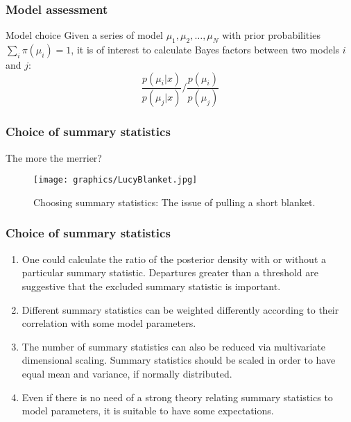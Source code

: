 \documentclass{beamer}
\newcommand{\1}{\ensuremath{\mathbf{1}}}
\begin{document}
%
%
%
\begin{frame}\frametitle{Model assessment}
	\begin{block}{Model choice}
		Given a series of model $\mu_1, \mu_2, \ldots, \mu_N$ with prior probabilities $\sum_i \pi(\mu_i) = 1$, it is of interest to calculate Bayes factors between two models $i$ and $j$:
		\begin{equation}
			\frac{p(\mu_i|x)}{p(\mu_j|x)} / \frac{p(\mu_i)}{p(\mu_j)} 
		\end{equation}
	\end{block}
\end{frame}
%
%
%
\begin{frame}\frametitle{Choice of summary statistics}
	The more the merrier?
	\begin{figure}
	\begin{center}
		\texttt{[image: graphics/LucyBlanket.jpg]}
	\end{center}
	\caption{Choosing summary statistics: The issue of pulling a short blanket.}
	\end{figure}
\end{frame}
%
%
%
\begin{frame}\frametitle{Choice of summary statistics}
	\begin{enumerate}
		\item One could calculate the ratio of the posterior density with or without a particular summary statistic. Departures greater than a threshold are suggestive that the excluded summary statistic is important.
		\item Different summary statistics can be weighted differently according to their correlation with some model parameters.
		\item The number of summary statistics can also be reduced via multivariate dimensional scaling. Summary statistics should be scaled in order to have equal mean and variance, if normally distributed.
		\item Even if there is no need of a strong theory relating summary statistics to model parameters, it is suitable to have some expectations.
	\end{enumerate}
\end{frame}
\end{document}
